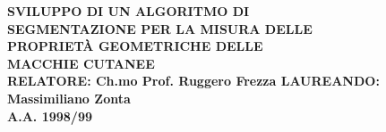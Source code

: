 
\pagestyle{empty}

\center
\large \bf
SVILUPPO DI UN ALGORITMO DI\\
SEGMENTAZIONE PER LA MISURA DELLE\\
PROPRIET\`A GEOMETRICHE DELLE\\
MACCHIE CUTANEE\\
\normalsize
\vspace{1cm}
{\sf RELATORE}: {\rm Ch.mo Prof. Ruggero Frezza}
\hfill
{\sf LAUREANDO}: {\rm Massimiliano Zonta} \\
\vspace{.8cm}
{\sf A.A. 1998/99}
\nocite{*}



